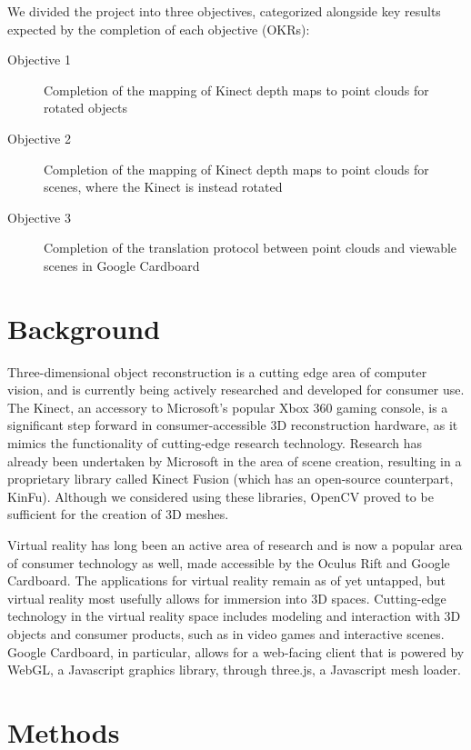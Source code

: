 \documentclass[11pt,oneside,english]{article}
\begin{document}
We divided the project into three objectives, categorized alongside key results
expected by the completion of each objective (OKRs):

\begin{description}
  \item[Objective 1]{Completion of the mapping of Kinect depth maps to point
      clouds for rotated objects}
  \item[Objective 2]{Completion of the mapping of Kinect depth maps to point
      clouds for scenes, where the Kinect is instead rotated}
  \item[Objective 3]{Completion of the translation protocol between point clouds
      and viewable scenes in Google Cardboard}
\end{description}

\section{Background}

Three-dimensional object reconstruction is a cutting edge area of computer
vision, and is currently being actively researched and developed for consumer
use. The Kinect, an accessory to Microsoft's popular Xbox 360 gaming console,
is a significant step forward in consumer-accessible 3D reconstruction
hardware, as it mimics the functionality of cutting-edge research technology.
Research has already been undertaken by Microsoft in the area of scene
creation, resulting in a proprietary library called Kinect Fusion (which has
an open-source counterpart, KinFu). Although we considered using these
libraries, OpenCV proved to be sufficient for the creation of 3D meshes.

Virtual reality has long been an active area of research and is now a popular
area of consumer technology as well, made accessible by the Oculus Rift and
Google Cardboard. The applications for virtual reality remain as of yet
untapped, but virtual reality most usefully allows for immersion into 3D
spaces. Cutting-edge technology in the virtual reality space includes modeling
and interaction with 3D objects and consumer products, such as in video games
and interactive scenes. Google Cardboard, in particular, allows for a
web-facing client that is powered by WebGL, a Javascript graphics library,
through three.js, a Javascript mesh loader.

\section{Methods}
\end{document}
